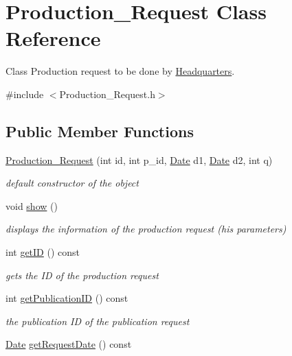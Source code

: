 \hypertarget{class_production___request}{}\section{Production\+\_\+\+Request Class Reference}
\label{class_production___request}


Class Production request to be done by \hyperlink{class_headquarters}{Headquarters}.  




{\ttfamily \#include $<$Production\+\_\+\+Request.\+h$>$}

\subsection*{Public Member Functions}
\begin{DoxyCompactItemize}
\item 
\hyperlink{class_production___request_a0c2c84b7434099e897226a93713dd050}{Production\+\_\+\+Request} (int id, int p\+\_\+id, \hyperlink{class_date}{Date} d1, \hyperlink{class_date}{Date} d2, int q)
\begin{DoxyCompactList}\small\item\em default constructor of the object \end{DoxyCompactList}\item 
void \hyperlink{class_production___request_ab08bac86aa95f28f06bf17685f7164aa}{show} ()
\begin{DoxyCompactList}\small\item\em displays the information of the production request (his parameters) \end{DoxyCompactList}\item 
int \hyperlink{class_production___request_ae2448a51f3bdab909bdc53f2e5bae666}{get\+ID} () const
\begin{DoxyCompactList}\small\item\em gets the ID of the production request \end{DoxyCompactList}\item 
int \hyperlink{class_production___request_aafa7c4bbaae9dc72c8954a6e1eaff817}{get\+Publication\+ID} () const
\begin{DoxyCompactList}\small\item\em the publication ID of the publication request \end{DoxyCompactList}\item 
\hyperlink{class_date}{Date} \hyperlink{class_production___request_aed0efd10e677d4bca14d00b5f981718a}{get\+Request\+Date} () const

\end{DoxyCompactItemize}
